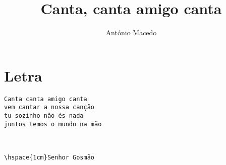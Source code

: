 \documentclass{article}
\author{António Macedo}
\title{Canta, canta amigo canta}
\begin{document}
\maketitle
\section{Letra}
\begin{verbatim}
Canta canta amigo canta
vem cantar a nossa canção
tu sozinho não és nada
juntos temos o mundo na mão



\hspace{1cm}Senhor Gosmão
\end{verbatim}
\end{document}
